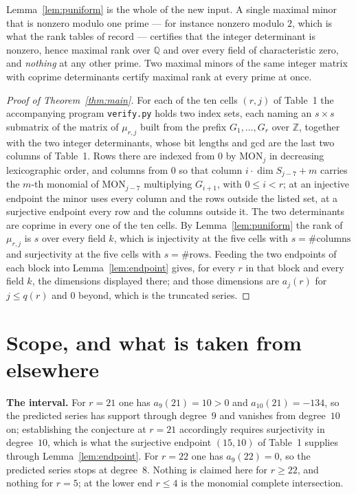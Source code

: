 \documentclass[11pt]{amsart}
\theoremstyle{remark}
\newcommand{\ZZ}{\mathbb Z}
\newcommand{\QQ}{\mathbb Q}
\begin{document}
Lemma~\ref{lem:puniform} is the whole of the new input. A single maximal minor
that is nonzero modulo one prime --- for instance nonzero modulo $2$, which is
what the rank tables of \cite{WZ} record --- certifies that the integer
determinant is nonzero, hence maximal rank over $\QQ$ and over every field of
characteristic zero, and \emph{nothing} at any other prime. Two maximal minors
of the same integer matrix with coprime determinants certify maximal rank at
every prime at once.

\begin{proof}[Proof of Theorem~\ref{thm:main}]
For each of the ten cells $(r,j)$ of Table~1 the accompanying program
\texttt{verify.py} holds two index sets, each naming an $s\times s$ submatrix of
the matrix of $\mu_{r,j}$ built from the prefix $G_1,\dots,G_r$ over $\ZZ$,
together with the two integer determinants, whose bit lengths and gcd are the
last two columns of Table~1. Rows there are indexed from $0$ by $\mathrm{MON}_j$
in decreasing lexicographic order, and columns from $0$ so that column
$i\cdot\dim S_{j-7}+m$ carries the $m$-th monomial of $\mathrm{MON}_{j-7}$
multiplying $G_{i+1}$, with $0\le i<r$; at an injective endpoint the minor uses
every column and the rows outside the listed set, at a surjective endpoint every
row and the columns outside it. The two determinants are coprime in every one of
the ten cells. By Lemma~\ref{lem:puniform} the rank of $\mu_{r,j}$ is $s$ over every
field $k$, which is injectivity at the five cells with $s=\#\text{columns}$ and
surjectivity at the five cells with $s=\#\text{rows}$. Feeding the two endpoints
of each block into Lemma~\ref{lem:endpoint} gives, for every $r$ in that block
and every field $k$, the dimensions displayed there; and those dimensions are
$a_j(r)$ for $j\le q(r)$ and $0$ beyond, which is the truncated series.
\end{proof}

\section{Scope, and what is taken from elsewhere}

\noindent\textbf{The interval.} For $r=21$ one has $a_9(21)=10>0$ and
$a_{10}(21)=-134$, so the predicted series has support through degree~$9$ and
vanishes from degree~$10$ on; establishing the conjecture at $r=21$ accordingly
requires surjectivity in degree~$10$, which is what the surjective endpoint
$(15,10)$ of Table~1 supplies through Lemma~\ref{lem:endpoint}. For $r=22$ one
has $a_9(22)=0$, so the predicted series
stops at degree~$8$. Nothing is claimed here for $r\ge22$, and nothing for
$r=5$; at the lower end $r\le4$ is the monomial complete intersection.
\end{document}
